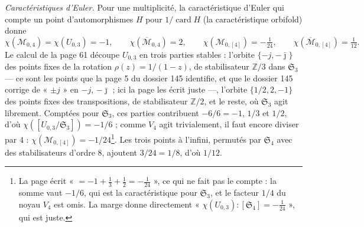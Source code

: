 \documentclass[11pt,a4paper]{article}
\begin{document}
\emph{Caractéristiques d'Euler.} Pour une multiplicité, la caractéristique d'Euler
qui compte un point d'automorphismes $H$ pour $1/\operatorname{card} H$ (la
caractéristique orbifold) donne
\[
\chi(\mathcal{M}_{0,4}) = \chi(U_{0,3}) = -1, \qquad
\chi(\overline{\mathcal{M}}_{0,4}) = 2, \qquad
\chi(\mathcal{M}_{0,[4]}) = -\tfrac{1}{24}, \qquad
\chi(\overline{\mathcal{M}}_{0,[4]}) = \tfrac{1}{12} .
\]
Le calcul de la page 61 découpe $U_{0,3}$ en trois parties stables : l'orbite
$\{-j, -\bar\jmath\}$ des points fixes de la rotation $\rho(z) = 1/(1 - z)$, de
stabilisateur $\mathbb{Z}/3$ dans $\mathfrak{S}_3$ — ce sont les points que la
page 5 du dossier 145 identifie, et que le dossier 145 corrige de « $\pm j$ » en
$-j$, $-\bar\jmath$ ; ici la page les écrit juste —, l'orbite $\{1/2, 2, -1\}$ des
points fixes des transpositions, de stabilisateur $\mathbb{Z}/2$, et le reste, où
$\mathfrak{S}_3$ agit librement. Comptées pour $\mathfrak{S}_3$, ces parties
contribuent $-6/6 = -1$, $1/3$ et $1/2$, d'où $\chi([U_{0,3}/\mathfrak{S}_3]) =
-1/6$ ; comme $V_4$ agit trivialement, il faut encore diviser par $4$ :
$\chi(\mathcal{M}_{0,[4]}) = -1/24$\footnote{La page écrit « $= -1 + \frac13 +
\frac12 = -\frac{1}{24}$ », ce qui ne fait pas le compte : la somme vaut
$-1/6$, qui est la caractéristique pour $\mathfrak{S}_3$, et le facteur $1/4$ du
noyau $V_4$ est omis. La marge donne directement « $\chi(U_{0,3}) :
[\mathfrak{S}_4] = -\frac{1}{24}$ », qui est juste.}. Les trois points à
l'infini, permutés par $\mathfrak{S}_4$ avec des stabilisateurs d'ordre $8$,
ajoutent $3/24 = 1/8$, d'où $1/12$.
\end{document}
